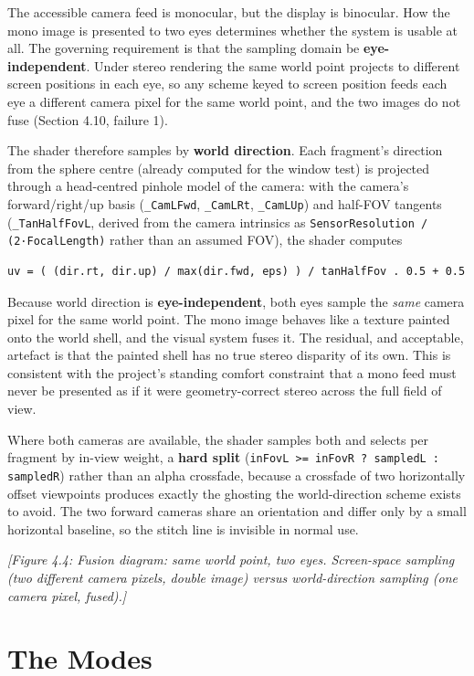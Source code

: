The accessible camera feed is monocular, but the display is binocular. How the mono image is presented
to two eyes determines whether the system is usable at all. The governing requirement is that the
sampling domain be \textbf{eye-independent}. Under stereo rendering the same world point projects to
different screen positions in each eye, so any scheme keyed to screen position feeds each eye a
different camera pixel for the same world point, and the two images do not fuse (Section 4.10,
failure 1).

The shader therefore samples by \textbf{world direction}. Each fragment's direction from the
sphere centre (already computed for the window test) is projected through a head-centred pinhole
model of the camera: with the camera's forward/right/up basis (\verb|_CamLFwd|, \verb|_CamLRt|, \verb|_CamLUp|) and
half-FOV tangents (\verb|_TanHalfFovL|, derived from the camera intrinsics as
\verb|SensorResolution / (2·FocalLength)| rather than an assumed FOV), the shader computes

\begin{verbatim}
uv = ( (dir.rt, dir.up) / max(dir.fwd, eps) ) / tanHalfFov . 0.5 + 0.5
\end{verbatim}

Because world direction is \textbf{eye-independent}, both eyes sample the \textit{same} camera pixel for the
same world point. The mono image behaves like a texture painted onto the world shell, and the visual
system fuses it. The residual, and acceptable, artefact is that the painted shell has no true
stereo disparity of its own. This is consistent with the project's standing comfort constraint that a
mono feed must never be presented as if it were geometry-correct stereo across the full field of view.

Where both cameras are available, the shader samples both and selects per fragment by in-view
weight, a \textbf{hard split} (\verb|inFovL >= inFovR ? sampledL : sampledR|) rather than an alpha crossfade,
because a crossfade of two horizontally offset viewpoints produces exactly the ghosting the
world-direction scheme exists to avoid. The two forward cameras share an orientation and differ only
by a small horizontal baseline, so the stitch line is invisible in normal use.

\textit{[Figure 4.4: Fusion diagram: same world point, two eyes. Screen-space sampling (two different
camera pixels, double image) versus world-direction sampling (one camera pixel, fused).]}

\section{The Modes}

